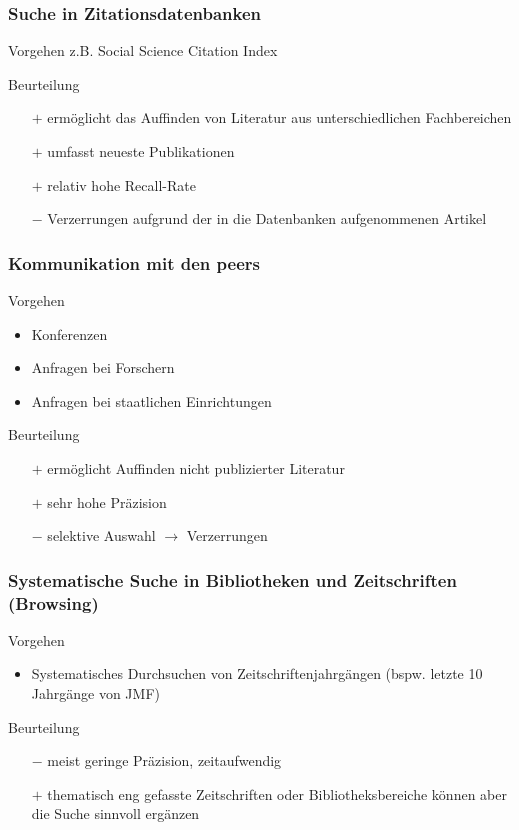 \begin{frame}
  \frametitle{Suche in Zitationsdatenbanken}
  \begin{block}{Vorgehen}
    z.B. Social Science Citation Index
  \end{block}
  \pause
  \begin{block}{Beurteilung}
    \begin{itemize}
    \item[$+$] ermöglicht das Auffinden von Literatur aus unterschiedlichen Fachbereichen
    \item[$+$] umfasst neueste Publikationen
    \item[$+$] relativ hohe Recall-Rate
    \item[$-$] Verzerrungen aufgrund der in die Datenbanken aufgenommenen Artikel
    \end{itemize}
  \end{block}
\end{frame}

\begin{frame}
  \frametitle{Kommunikation mit den peers}
  \begin{block}{Vorgehen}
    \begin{itemize}
    \item Konferenzen
    \item Anfragen bei Forschern
    \item Anfragen bei staatlichen Einrichtungen
    \end{itemize}
  \end{block}
  \begin{block}{Beurteilung}
    \begin{itemize}
    \item[$+$] ermöglicht Auffinden nicht publizierter Literatur
    \item[$+$] sehr hohe Präzision
    \item[$-$] selektive Auswahl $\rightarrow$ Verzerrungen
    \end{itemize}
  \end{block}
\end{frame}


\begin{frame}\frametitle{Systematische Suche in Bibliotheken und Zeitschriften (Browsing)}

  \begin{block}{Vorgehen}
    \begin{itemize}
    \item Systematisches Durchsuchen von Zeitschriftenjahrgängen (bspw. letzte 10 Jahrgänge von JMF)
    \end{itemize}
  \end{block}
  \begin{block}{Beurteilung}
    \begin{itemize}
    \item[$-$] meist geringe Präzision, zeitaufwendig
    \item[$+$] thematisch eng gefasste Zeitschriften oder Bibliotheksbereiche können aber die Suche sinnvoll ergänzen
    \end{itemize}
  \end{block}
\end{frame}




